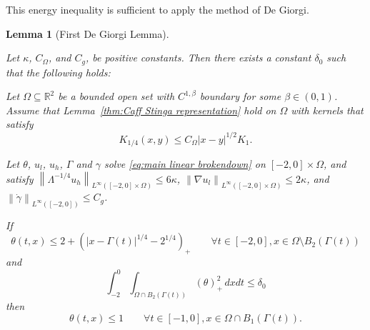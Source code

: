 \documentclass[11pt]{amsart}
\newtheorem{lemma}[theorem]{Lemma}
\theoremstyle{remark}
\theoremstyle{definition}
\newcommand{\R}{\mathbb{R}}
\newcommand{\norm}[1]{\left\lVert#1\right\rVert}
\newcommand{\paren}[1]{\left( #1 \right)}
\newcommand{\grad}{\nabla}
\newcommand{\ulow}{u_l}
\newcommand{\uhigh}{u_h}
\newcommand{\Cgamma}{C_g}
\newcommand{\Comega}{C_\Omega}
\begin{document}
This energy inequality is sufficient to apply the method of De Giorgi.  

\begin{lemma}[First De Giorgi Lemma] \label{thm:DG1}

Let $\kappa$, $\Comega$, and $\Cgamma$, be positive constants. Then there exists a constant $\delta_0$ such that the following holds:

Let $\Omega \subseteq \R^2$ be a bounded open set with $C^{1,\beta}$ boundary for some $\beta \in (0,1)$.  Assume that Lemma~\ref{thm:Caff Stinga representation} hold on $\Omega$ with kernels that satisfy
\[ K_{1/4}(x,y) \leq \Comega |x-y|^{1/2} K_{1}. \]

Let $\theta$, $\ulow$, $\uhigh$, $\Gamma$ and $\gamma$ solve \eqref{eq:main linear brokendown} on $[-2,0]\times\Omega$, and satisfy $\norm{\Lambda^{-1/4} \uhigh}_{L^\infty([-2,0]\times\Omega)} \leq 6 \kappa$, $\norm{\grad \ulow}_{L^\infty([-2,0]\times\Omega)} \leq 2\kappa$, and $\norm{\dot{\gamma}}_{L^\infty([-2,0])} \leq \Cgamma$.  

If
\[ \theta(t,x) \leq 2 + \paren{|x-\Gamma(t)|^{1/4}-2^{1/4}}_+ \qquad \forall t\in[-2,0], x \in \Omega \setminus B_2(\Gamma(t)) \]
and
\[ \int_{-2}^0 \int_{\Omega\cap B_2(\Gamma(t))} (\theta)_+^2 \,dxdt \leq \delta_0 \]
then
\[ \theta(t,x) \leq 1 \qquad \forall t \in [-1,0], x \in \Omega \cap B_1(\Gamma(t)). \]

\end{lemma}
\end{document}
